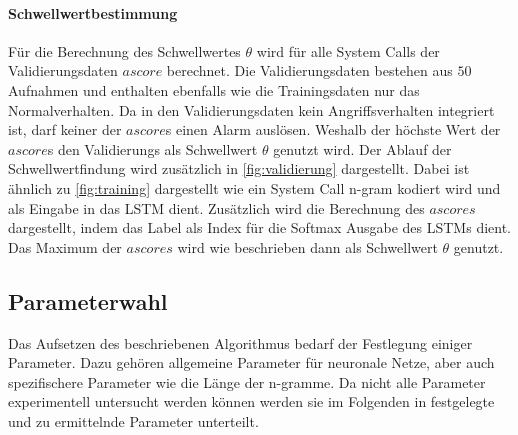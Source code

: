             \paragraph{Schwellwertbestimmung}\label{sec:Schwellung}
                Für die Berechnung des Schwellwertes $\theta$ wird für alle System Calls der Validierungsdaten $ascore$ berechnet.
                Die Validierungsdaten bestehen aus $50$ Aufnahmen und enthalten ebenfalls wie die Trainingsdaten nur das Normalverhalten.
                Da in den Validierungsdaten kein Angriffsverhalten integriert ist, darf keiner der $ascore$s einen Alarm auslösen.
                Weshalb der höchste Wert der $ascore$s den Validierungs als Schwellwert $\theta$ genutzt wird.
                Der Ablauf der Schwellwertfindung wird zusätzlich in \autoref{fig:validierung} dargestellt.
                Dabei ist ähnlich zu \autoref{fig:training} dargestellt wie ein System Call n-gram kodiert wird und als Eingabe in das \ac{LSTM} dient.
                Zusätzlich wird die Berechnung des $ascores$ dargestellt, indem das Label als Index für die Softmax  Ausgabe des \acp{LSTM} dient.
                Das Maximum der $ascores$ wird wie beschrieben dann als Schwellwert $\theta$ genutzt.

        \subsection{Parameterwahl}\label{sec:parameterwahl}
            Das Aufsetzen des beschriebenen Algorithmus bedarf der Festlegung einiger Parameter.
            Dazu gehören allgemeine Parameter für neuronale Netze, aber auch spezifischere Parameter wie die Länge der n-gramme.
            Da nicht alle Parameter experimentell untersucht werden können werden sie im Folgenden in festgelegte und zu ermittelnde Parameter unterteilt.
